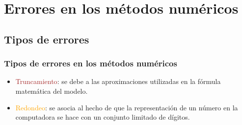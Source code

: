 \section{Errores en los métodos numéricos}
\subsection{Tipos de errores}
\begin{frame}
\frametitle{Tipos de errores en los métodos numéricos}
\begin{itemize}[<+->]
\item \textcolor{brown}{Truncamiento}: se debe a las aproximaciones utilizadas en la fórmula
matemática del modelo.
\item \textcolor{orange}{Redondeo}: se asocia al hecho de que la representación de un número en la computadora se hace con un conjunto limitado de dígitos.
\end{itemize}
\end{frame}
